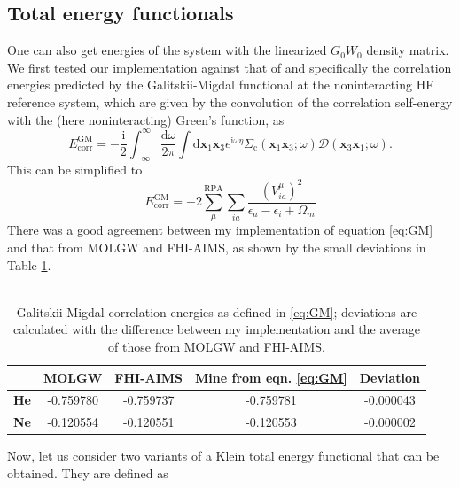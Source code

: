 \documentclass[12pt]{caltech_thesis}
\begin{document}
\subsection{Total energy functionals}
\label{chap:total_energy}
One can also get energies of the system with the linearized $G_0W_0$ density matrix. We first tested our implementation against that of \textcite{bruneval_improved_2021} and specifically the correlation energies predicted by the Galitskii-Migdal functional at the noninteracting HF reference system, which are given by the convolution of the correlation self-energy with the (here noninteracting) Green's function, as 
\begin{equation}
E_{\mathrm{corr}}^{\mathrm{GM}}=-\frac{\mathrm{i}}{2} \int_{-\infty}^{\infty} \frac{\mathrm{d} \omega}{2 \pi} \int \mathrm{d} \boldsymbol{x}_1 \boldsymbol{x}_3 e^{\mathrm{i} \omega \eta} \Sigma_{\mathrm{c}}\left(\boldsymbol{x}_1 \boldsymbol{x}_3 ; \omega\right) \mathcal{D}\left(\boldsymbol{x}_3 \boldsymbol{x}_1 ; \omega\right).
\end{equation}
This can be simplified to
\begin{equation}
E_{\mathrm{corr}}^{\mathrm{GM}}=-2\sum_{\mu}^{\mathrm{RPA}} \sum_{i a} \frac{(V_{ia}^{\mu})^2}{\epsilon_a-\epsilon_i+\Omega_m}
\label{eq:GM}
\end{equation}
There was a good agreement between my implementation of equation \ref{eq:GM} and that from MOLGW and FHI-AIMS, as shown by the small deviations in Table \ref{tab:galitskii}.\\\\
\begin{table}[h!]
    \centering
    \begin{tabular}{lcccc}
        \toprule
        & \textbf{MOLGW} & \textbf{FHI-AIMS} & \textbf{Mine from eqn. \ref{eq:GM}} & \textbf{Deviation} \\
        \midrule
        \textbf{He} & -0.759780 & -0.759737 & -0.759781 & -0.000043 \\
        \textbf{Ne} & -0.120554 & -0.120551 & -0.120553 & -0.000002 \\
        \bottomrule
    \end{tabular}
    \caption{Galitskii-Migdal correlation energies as defined in \ref{eq:GM}; deviations are calculated with the difference between my implementation and the average of those from MOLGW and FHI-AIMS.}
    \label{tab:galitskii}
\end{table}
Now, let us consider two variants of a Klein total energy functional that can be obtained. They are defined as
\end{document}
